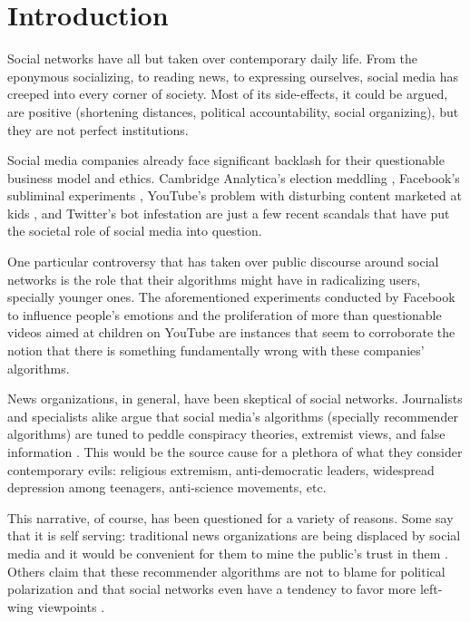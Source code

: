 
\chapter{Introduction}
\label{cap:introduction}

Social networks have all but taken over contemporary daily life. From the
eponymous socializing, to reading news, to expressing ourselves, social media
has creeped into every corner of society. Most of its side-effects, it could be
argued, are positive (shortening distances, political accountability, social
organizing), but they are not perfect institutions.

Social media companies already face significant backlash for their questionable
business model and ethics. Cambridge Analytica's election meddling
\citep{cadwalladr_revealed_2018}, Facebook's subliminal experiments
\citep{kramer_experimental_2014}, YouTube's problem with disturbing content
marketed at kids \citep{dredge_youtubes_2016}, and Twitter's bot infestation
\citep{varol_online_2017} are just a few recent scandals that have put the
societal role of social media into question.

One particular controversy that has taken over public discourse around social
networks is the role that their algorithms might have in radicalizing users,
specially younger ones. The aforementioned experiments conducted by Facebook to
influence people's emotions and the proliferation of more than questionable
videos aimed at children on YouTube are instances that seem to corroborate the
notion that there is something fundamentally wrong with these companies'
algorithms.

News organizations, in general, have been skeptical of social networks.
Journalists and specialists alike argue that social media's algorithms
(specially recommender algorithms) are tuned to peddle conspiracy theories,
extremist views, and false information \citep{noauthor_mozilla_2021-1}. This
would be the source cause for a plethora of what they consider contemporary
evils: religious extremism, anti-democratic leaders, widespread depression among
teenagers, anti-science movements, etc.

This narrative, of course, has been questioned for a variety of reasons. Some
say that it is self serving: traditional news organizations are being displaced
by social media and it would be convenient for them to mine the public's trust
in them \citep{munger_right-wing_2020}. Others claim that these recommender
algorithms are not to blame for political polarization and that social networks
even have a tendency to favor more left-wing viewpoints
\citep{ledwich_algorithmic_2019}.

